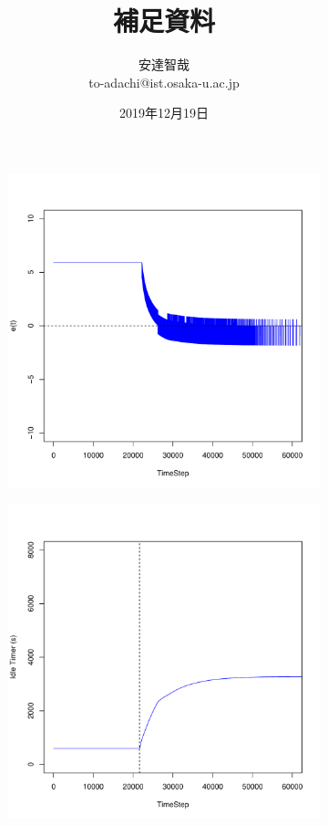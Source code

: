 \documentclass[a4j]{ujarticle}
\title{補足資料}
\author{安達智哉\\to-adachi@ist.osaka-u.ac.jp}
\date{2019年12月19日}
\begin{document}
\maketitle





\begin{figure}[htbp]
 \centering
 \begin{subfigure}{0.49\hsize}
   \centering
   \includegraphics[width=1.0\hsize]{scenario_5_e_86400_345600_1_0_0_0_ideal.pdf}
   \label{subfig:scenario_5_e_86400_345600_0-318_1_0_0_0_ideal}
 \end{subfigure}
 \begin{subfigure}{0.49\hsize}
   \centering
   \includegraphics[width=1.0\hsize]{scenario_5_idleTimer_86400_345600_1_0_0_0_ideal.pdf}

\end{subfigure}
\end{figure}
\end{document}
